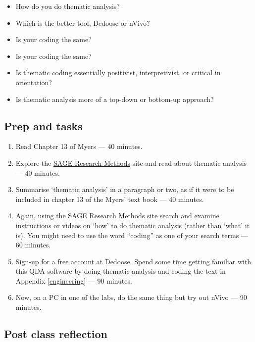\documentclass[]{book}
\theoremstyle{definition}
\theoremstyle{definition}
\theoremstyle{definition}
\theoremstyle{remark}
\begin{document}
\begin{itemize}
\item
  How do you do thematic analysis?
\item
  Which is the better tool, Dedoose or nVivo?
\item
  Is your coding the same?
\item
  Is your coding the same?
\item
  Is thematic coding essentially positivist, interpretivist, or critical
  in orientation?
\item
  Is thematic analysis more of a top-down or bottom-up approach?
\end{itemize}

\hypertarget{prep-and-tasks-5}{%
\subsection*{Prep and tasks}\label{prep-and-tasks-5}}

\begin{enumerate}
\def\labelenumi{\arabic{enumi}.}
\item
  Read Chapter 13 of Myers \autocite*[
  p.~165--181]{myers_2013_qualitativeresearchbusiness} --- 40 minutes.
\item
  Explore the
  \href{http://methods.sagepub.com.ezproxy.auckland.ac.nz/}{SAGE
  Research Methods} site and read about thematic analysis --- 40
  minutes.
\item
  Summarise `thematic analysis' in a paragraph or two, as if it were to
  be included in chapter 13 of the Myers' text book --- 40 minutes.
\item
  Again, using the
  \href{http://methods.sagepub.com.ezproxy.auckland.ac.nz/}{SAGE
  Research Methods} site search and examine instructions or videos on
  `how' to do thematic analysis (rather than `what' it is). You might
  need to use the word ``coding'' as one of your search terms --- 60
  minutes.
\item
  Sign-up for a free account at \href{http://dedoose.com}{Dedoose}.
  Spend some time getting familiar with this QDA software by doing
  thematic analysis and coding the text in Appendix \ref{engineering}
  --- 90 minutes.
\item
  Now, on a PC in one of the labs, do the same thing but try out nVivo
  --- 90 minutes.
\end{enumerate}

\hypertarget{post-class-reflection-5}{%
\subsection*{Post class reflection}\label{post-class-reflection-5}}
\end{document}
